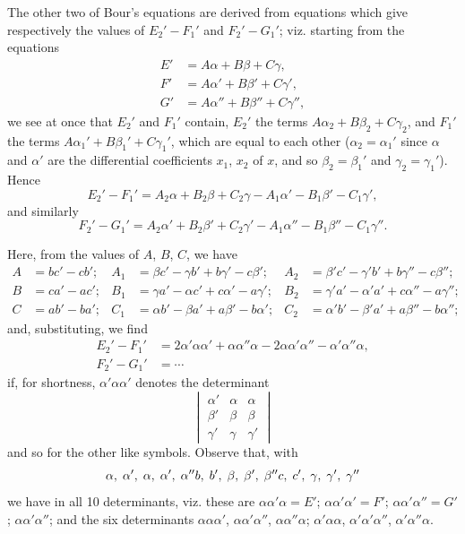 \documentclass[11pt,a4paper]{article}
\theoremstyle{definition}
\begin{document}
The other two of Bour's equations are derived from equations which give respectively the values of $E_2' - F_1'$ and $F_2' - G_1'$; viz. starting from the equations
\[
\begin{aligned}
E' &= A\alpha + B\beta + C\gamma,\\
F' &= A\alpha' + B\beta' + C\gamma',\\
G' &= A\alpha'' + B\beta'' + C\gamma'',
\end{aligned}
\]
we see at once that $E_2'$ and $F_1'$ contain, $E_2'$ the terms $A\alpha_2 + B\beta_2 + C\gamma_2$, and $F_1'$ the terms $A\alpha_1' + B\beta_1' + C\gamma_1'$, which are equal to each other ($\alpha_2 = \alpha_1'$ since $\alpha$ and $\alpha'$ are the differential coefficients $x_1$, $x_2$ of $x$, and so $\beta_2 = \beta_1'$ and $\gamma_2 = \gamma_1'$). Hence
\[
E_2' - F_1' = A_2\alpha + B_2\beta + C_2\gamma - A_1\alpha' - B_1\beta' - C_1\gamma',
\]
and similarly
\[
F_2' - G_1' = A_2\alpha' + B_2\beta' + C_2\gamma' - A_1\alpha'' - B_1\beta'' - C_1\gamma''.
\]

Here, from the values of $A$, $B$, $C$, we have
\[
\begin{aligned}
A &= bc' - cb'; & A_1 &= \beta c' - \gamma b' + b\gamma' - c\beta'; & A_2 &= \beta'c' - \gamma'b' + b\gamma'' - c\beta'';\\
B &= ca' - ac'; & B_1 &= \gamma a' - \alpha c' + c\alpha' - a\gamma'; & B_2 &= \gamma'a' - \alpha'a' + c\alpha'' - a\gamma'';\\
C &= ab' - ba'; & C_1 &= \alpha b' - \beta a' + a\beta' - b\alpha'; & C_2 &= \alpha'b' - \beta'a' + a\beta'' - b\alpha'';
\end{aligned}
\]
and, substituting, we find
\[
\begin{aligned}
E_2' - F_1' &= 2\alpha'\alpha\alpha' + \alpha\alpha''\alpha - 2\alpha\alpha'\alpha'' - \alpha'\alpha''\alpha,\\
F_2' - G_1' &= \dotsb
\end{aligned}
\]
if, for shortness, $\alpha'\alpha\alpha'$ denotes the determinant
\[
\begin{vmatrix}
\alpha' & \alpha & \alpha \\
\beta' & \beta & \beta \\
\gamma' & \gamma & \gamma'
\end{vmatrix}
\]
and so for the other like symbols. Observe that, with
\[
\alpha,\; \alpha',\; \alpha,\; \alpha',\; \alpha''\\
b,\; b',\; \beta,\; \beta',\; \beta''\\
c,\; c',\; \gamma,\; \gamma',\; \gamma''
\]
we have in all 10 determinants, viz. these are $\alpha\alpha'\alpha = E'$; $\alpha\alpha'\alpha' = F'$; $\alpha\alpha'\alpha'' = G'$; $\alpha\alpha'\alpha''$; and the six determinants $\alpha\alpha\alpha'$, $\alpha\alpha'\alpha''$, $\alpha\alpha''\alpha$; $\alpha'\alpha\alpha$, $\alpha'\alpha'\alpha''$, $\alpha'\alpha''\alpha$.
\end{document}
